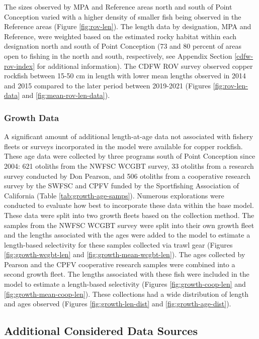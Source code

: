\documentclass[11pt,
  english,
  letterpaper,
]{article}
\begin{document}
The sizes observed by MPA and Reference areas north and south of Point Conception varied with a higher density of smaller fish being observed in the Reference areas (Figure \ref{fig:rov-len}). The length data by designation, MPA and Reference, were weighted based on the estimated rocky habitat within each designation north and south of Point Conception (73 and 80 percent of areas open to fishing in the north and south, respectively, see Appendix Section \ref{cdfw-rov-index} for additional information). The CDFW ROV survey observed copper rockfish between 15-50 cm in length with lower mean lengths observed in 2014 and 2015 compared to the later period between 2019-2021 (Figures \ref{fig:rov-len-data} and \ref{fig:mean-rov-len-data}).

\hypertarget{growth-data}{%
\subsubsection{Growth Data}\label{growth-data}}

A significant amount of additional length-at-age data not associated with fishery fleets or surveys incorporated in the model were available for copper rockfish. These age data were collected by three programs south of Point Conception since 2004: 621 otoliths from the NWFSC WCGBT survey, 33 otoliths from a research survey conducted by Don Pearson, and 506 otoliths from a cooperative research survey by the SWFSC and CPFV funded by the Sportfishing Association of California (Table \ref{tab:growth-age-samps}). Numerous explorations were conducted to evaluate how best to incorporate these data within the base model. These data were split into two growth fleets based on the collection method. The samples from the NWFSC WCGBT survey were split into their own growth fleet and the lengths associated with the ages were added to the model to estimate a length-based selectivity for these samples collected via trawl gear (Figures \ref{fig:growth-wcgbt-len} and \ref{fig:growth-mean-wcgbt-len}). The ages collected by Pearson and the CPFV cooperative research samples were combined into a second growth fleet. The lengths associated with these fish were included in the model to estimate a length-based selectivity (Figures \ref{fig:growth-coop-len} and \ref{fig:growth-mean-coop-len}). These collections had a wide distribution of length and ages observed (Figures \ref{fig:growth-len-dist} and \ref{fig:growth-age-dist}).

\hypertarget{additional-considered-data-sources}{%
\subsection{Additional Considered Data Sources}\label{additional-considered-data-sources}}
\end{document}
